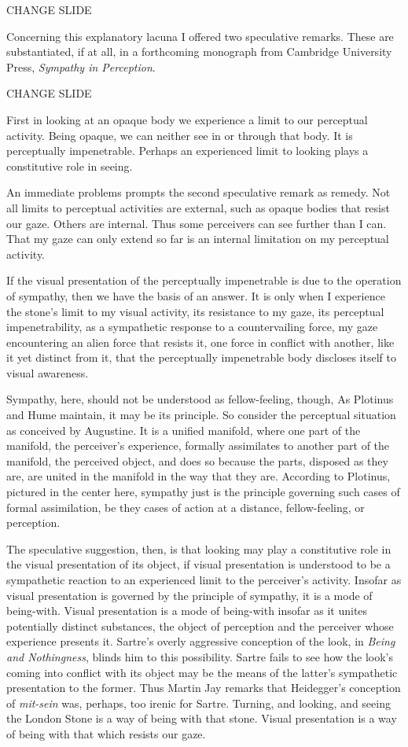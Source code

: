 \documentclass[12pt]{article}
\begin{document}
CHANGE SLIDE

Concerning this explanatory lacuna I offered two speculative remarks. These are substantiated, if at all, in a forthcoming monograph from Cambridge University Press, \emph{Sympathy in Perception}.

CHANGE SLIDE

First in looking at an opaque body we experience a limit to our perceptual activity. Being opaque, we can neither see in or through that body. It is perceptually impenetrable. Perhaps an experienced limit to looking plays a constitutive role in seeing. 

An immediate problems prompts the second speculative remark as remedy. Not all limits to perceptual activities are external, such as opaque bodies that resist our gaze. Others are internal. Thus some perceivers can see further than I can. That my gaze can only extend so far is an internal limitation on my perceptual activity. 

If the visual presentation of the perceptually impenetrable is due to the operation of sympathy, then we have the basis of an answer. It is only when I experience the stone’s limit to my visual activity, its resistance to my gaze, its perceptual impenetrability, as a sympathetic response to a countervailing force, my gaze encountering an alien force that resists it, one force in conflict with another, like it yet distinct from it, that the perceptually impenetrable body discloses itself to visual awareness.

Sympathy, here, should not be understood as fellow-feeling, though, As Plotinus and Hume maintain, it may be its principle. So consider the perceptual situation as conceived by Augustine. It is a unified manifold, where one part of the manifold, the perceiver's experience, formally assimilates to another part of the manifold, the perceived object, and does so because the parts, disposed as they are, are united in the manifold in the way that they are. According to Plotinus, pictured in the center here, sympathy just is the principle governing such cases of formal assimilation, be they cases of action at a distance, fellow-feeling, or perception. 

The speculative suggestion, then, is that looking may play a constitutive role
in the visual presentation of its object, if visual presentation is understood to be a sympathetic reaction to an experienced limit to the perceiver’s activity. Insofar as visual presentation is governed by the principle of sympathy, it is a mode of being-with. Visual presentation is a mode of being-with insofar as it unites potentially distinct substances, the object of perception and the perceiver whose experience presents it. Sartre’s overly aggressive conception of the look, in \emph{Being and Nothingness}, blinds him to this possibility. Sartre fails to see how the look’s coming into conflict with its object may be the means of the latter’s sympathetic presentation to the former. Thus Martin Jay remarks that Heidegger’s conception of \emph{mit-sein} was, perhaps, too irenic for Sartre. Turning, and looking, and seeing the London Stone is a way of being with that stone. Visual presentation is a way of being with that which resists our gaze.
\end{document}

